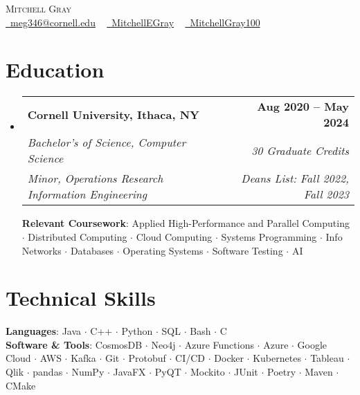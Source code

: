 \documentclass[letterpaper,11pt]{article}
\makeatletter
\newcommand{\resumeSpecialSubheading}[6]{
  \vspace{-2pt}\item
    \begin{tabular*}{1.0\textwidth}[t]{l@{\extracolsep{\fill}}r}
      \textbf{#1} & \textbf{\small #2} \\
      \textit{\small#3} & \textit{\small #4} \\
      \textit{\small#5} & \textit{\small #6} \\
    \end{tabular*}\vspace{-7pt}
}
\newcommand{\resumeSubHeadingListStart}{\begin{itemize}[leftmargin=0.0in, label={}]}
\newcommand{\resumeSubHeadingListEnd}{\end{itemize}}
\makeatother
\begin{document}
\begin{center}
    {\Huge \scshape Mitchell Gray} \\ \vspace{1pt}
    \small
    \href{mailto:youremail@gmail.com}{\faEnvelope\ meg346@cornell.edu} ~ 
    \href{https://www.linkedin.com/in/mitchellegray/}{\faLinkedin\ MitchellEGray}  ~
    \href{https://github.com/MitchellGray100}{\faGithub\ MitchellGray100}
    \vspace{-8pt}
\end{center}


\section{Education}
  \resumeSubHeadingListStart
    \resumeSpecialSubheading
      {Cornell University, Ithaca, NY}{Aug 2020 -- May 2024}
      {Bachelor's of Science, Computer Science}{30 Graduate Credits}%
      {Minor, Operations Research Information Engineering}{Deans List: Fall 2022, Fall 2023}

      \textbf{Relevant Coursework}: Applied High-Performance and Parallel Computing $\cdot$ Distributed Computing $\cdot$ Cloud 
      Computing $\cdot$ Systems Programming $\cdot$ Info Networks $\cdot$ Databases 
      $\cdot$ Operating Systems $\cdot$ Software Testing $\cdot$ AI 
               

  \resumeSubHeadingListEnd
\vspace{-18pt}

\section{Technical Skills}
 \begin{itemize}[leftmargin=0.1in, label={}]
    \small{\item{
     \textbf{Languages}{: Java $\cdot$ C++ $\cdot$ Python $\cdot$ SQL $\cdot$ Bash $\cdot$ C} \\
     \textbf{Software \& Tools}{: 
     CosmosDB $\cdot$ Neo4j $\cdot$ 
     Azure Functions $\cdot$ Azure $\cdot$ Google Cloud $\cdot$ AWS $\cdot$ Kafka $\cdot$
     Git $\cdot$ Protobuf $\cdot$ CI/CD $\cdot$ Docker $\cdot$ Kubernetes
     $\cdot$ Tableau $\cdot$ Qlik $\cdot$ pandas $\cdot$ NumPy $\cdot$
     JavaFX $\cdot$ PyQT $\cdot$ 
     Mockito $\cdot$ JUnit $\cdot$
     Poetry $\cdot$ Maven $\cdot$ CMake}\\
    }}
 \end{itemize}
 \vspace{-20pt}
\end{document}
